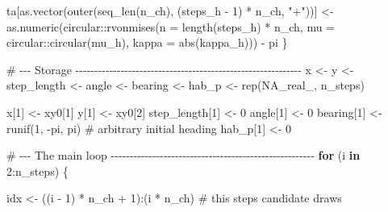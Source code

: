 \documentclass[
  letterpaper,
  DIV=11,
  numbers=noendperiod]{scrartcl}
\newenvironment{Shaded}{\begin{snugshade}}{\end{snugshade}}
\newcommand{\AttributeTok}[1]{\textcolor[rgb]{0.40,0.45,0.13}{#1}}
\newcommand{\CommentTok}[1]{\textcolor[rgb]{0.37,0.37,0.37}{#1}}
\newcommand{\ConstantTok}[1]{\textcolor[rgb]{0.56,0.35,0.01}{#1}}
\newcommand{\ControlFlowTok}[1]{\textcolor[rgb]{0.00,0.23,0.31}{\textbf{#1}}}
\newcommand{\DecValTok}[1]{\textcolor[rgb]{0.68,0.00,0.00}{#1}}
\newcommand{\FunctionTok}[1]{\textcolor[rgb]{0.28,0.35,0.67}{#1}}
\newcommand{\NormalTok}[1]{\textcolor[rgb]{0.00,0.23,0.31}{#1}}
\newcommand{\OtherTok}[1]{\textcolor[rgb]{0.00,0.23,0.31}{#1}}
\newcommand{\SpecialCharTok}[1]{\textcolor[rgb]{0.37,0.37,0.37}{#1}}
\newcommand{\StringTok}[1]{\textcolor[rgb]{0.13,0.47,0.30}{#1}}
\begin{document}
\begin{Shaded}
\begin{Highlighting}[]
\NormalTok{    ta[}\FunctionTok{as.vector}\NormalTok{(}\FunctionTok{outer}\NormalTok{(}\FunctionTok{seq\_len}\NormalTok{(n\_ch), (steps\_h }\SpecialCharTok{{-}} \DecValTok{1}\NormalTok{) }\SpecialCharTok{*}\NormalTok{ n\_ch, }\StringTok{"+"}\NormalTok{))] }\OtherTok{\textless{}{-}}
      \FunctionTok{as.numeric}\NormalTok{(circular}\SpecialCharTok{::}\FunctionTok{rvonmises}\NormalTok{(}\AttributeTok{n     =} \FunctionTok{length}\NormalTok{(steps\_h) }\SpecialCharTok{*}\NormalTok{ n\_ch,}
                                     \AttributeTok{mu    =}\NormalTok{ circular}\SpecialCharTok{::}\FunctionTok{circular}\NormalTok{(mu\_h),}
                                     \AttributeTok{kappa =} \FunctionTok{abs}\NormalTok{(kappa\_h))) }\SpecialCharTok{{-}}\NormalTok{ pi}
\NormalTok{  \}}

  \CommentTok{\# {-}{-}{-} Storage {-}{-}{-}{-}{-}{-}{-}{-}{-}{-}{-}{-}{-}{-}{-}{-}{-}{-}{-}{-}{-}{-}{-}{-}{-}{-}{-}{-}{-}{-}{-}{-}{-}{-}{-}{-}{-}{-}{-}{-}{-}{-}{-}{-}{-}{-}{-}{-}{-}{-}{-}{-}{-}{-}{-}{-}{-}{-}{-}{-}}
\NormalTok{  x }\OtherTok{\textless{}{-}}\NormalTok{ y }\OtherTok{\textless{}{-}}\NormalTok{ step\_length }\OtherTok{\textless{}{-}}\NormalTok{ angle }\OtherTok{\textless{}{-}}\NormalTok{ bearing }\OtherTok{\textless{}{-}}\NormalTok{ hab\_p }\OtherTok{\textless{}{-}} \FunctionTok{rep}\NormalTok{(}\ConstantTok{NA\_real\_}\NormalTok{, n\_steps)}

\NormalTok{  x[}\DecValTok{1}\NormalTok{] }\OtherTok{\textless{}{-}}\NormalTok{ xy0[}\DecValTok{1}\NormalTok{]}
\NormalTok{  y[}\DecValTok{1}\NormalTok{] }\OtherTok{\textless{}{-}}\NormalTok{ xy0[}\DecValTok{2}\NormalTok{]}
\NormalTok{  step\_length[}\DecValTok{1}\NormalTok{] }\OtherTok{\textless{}{-}} \DecValTok{0}
\NormalTok{  angle[}\DecValTok{1}\NormalTok{]   }\OtherTok{\textless{}{-}} \DecValTok{0}
\NormalTok{  bearing[}\DecValTok{1}\NormalTok{] }\OtherTok{\textless{}{-}} \FunctionTok{runif}\NormalTok{(}\DecValTok{1}\NormalTok{, }\SpecialCharTok{{-}}\NormalTok{pi, pi)   }\CommentTok{\# arbitrary initial heading}
\NormalTok{  hab\_p[}\DecValTok{1}\NormalTok{]   }\OtherTok{\textless{}{-}} \DecValTok{0}

  \CommentTok{\# {-}{-}{-} The main loop {-}{-}{-}{-}{-}{-}{-}{-}{-}{-}{-}{-}{-}{-}{-}{-}{-}{-}{-}{-}{-}{-}{-}{-}{-}{-}{-}{-}{-}{-}{-}{-}{-}{-}{-}{-}{-}{-}{-}{-}{-}{-}{-}{-}{-}{-}{-}{-}{-}{-}{-}{-}{-}{-}}
  \ControlFlowTok{for}\NormalTok{ (i }\ControlFlowTok{in} \DecValTok{2}\SpecialCharTok{:}\NormalTok{n\_steps) \{}

\NormalTok{    idx }\OtherTok{\textless{}{-}}\NormalTok{ ((i }\SpecialCharTok{{-}} \DecValTok{1}\NormalTok{) }\SpecialCharTok{*}\NormalTok{ n\_ch }\SpecialCharTok{+} \DecValTok{1}\NormalTok{)}\SpecialCharTok{:}\NormalTok{(i }\SpecialCharTok{*}\NormalTok{ n\_ch)   }\CommentTok{\# this step\textquotesingle{}s candidate draws}


\end{Highlighting}
\end{Shaded}
\end{document}
